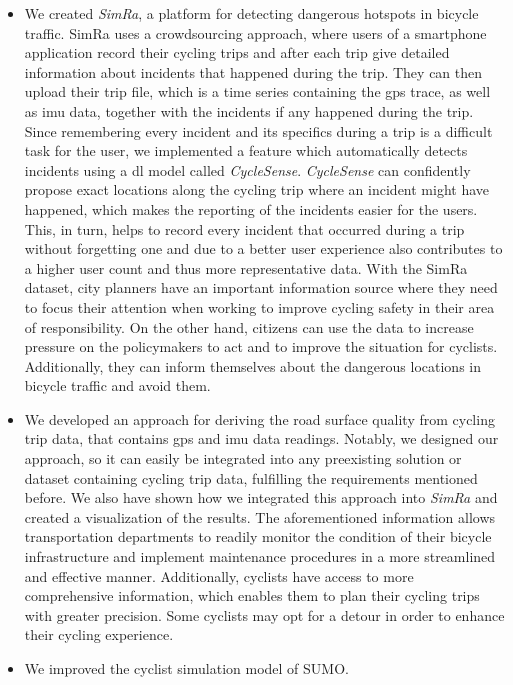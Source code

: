 \begin{itemize}
\item We created \textit{SimRa}, a platform for detecting dangerous hotspots in bicycle traffic.
SimRa uses a crowdsourcing approach, where users of a smartphone application record their cycling trips and after each trip give detailed information about incidents that happened during the trip.
They can then upload their trip file, which is a time series containing the \ac{gps} trace, as well as \ac{imu} data, together with the incidents if any happened during the trip.
Since remembering every incident and its specifics during a trip is a difficult task for the user, we implemented a feature which automatically detects incidents using a \ac{dl} model called \textit{CycleSense}.
\textit{CycleSense} can confidently propose exact locations along the cycling trip where an incident might have happened, which makes the reporting of the incidents easier for the users.
This, in turn, helps to record every incident that occurred during a trip without forgetting one and due to a better user experience also contributes to a higher user count and thus more representative data. 
With the SimRa dataset, city planners have an important information source where they need to focus their attention when working to improve cycling safety in their area of responsibility.
On the other hand, citizens can use the data to increase pressure on the policymakers to act and to improve the situation for cyclists.
Additionally, they can inform themselves about the dangerous locations in bicycle traffic and avoid them.
\item We developed an approach for deriving the road surface quality from cycling trip data, that contains \ac{gps} and \ac{imu} data readings.
Notably, we designed our approach, so it can easily be integrated into any preexisting solution or dataset containing cycling trip data, fulfilling the requirements mentioned before.
We also have shown how we integrated this approach into \textit{SimRa} and created a visualization of the results.
The aforementioned information allows transportation departments to readily monitor the condition of their bicycle infrastructure and implement maintenance procedures in a more streamlined and effective manner.
Additionally, cyclists have access to more comprehensive information, which enables them to plan their cycling trips with greater precision.
Some cyclists may opt for a detour in order to enhance their cycling experience.
\item We improved the cyclist simulation model of SUMO.

\end{itemize}

